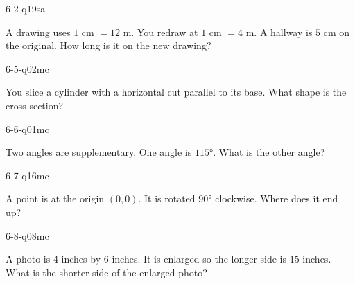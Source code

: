 \begin{practiceQuestion}{6-2-q19}{sa}
\begin{questionText}
A drawing uses $1$ cm $= 12$ m. You redraw at $1$ cm $= 4$ m. A hallway is $5$ cm on the original. How long is it on the new drawing?
\end{questionText}
\end{practiceQuestion}

\begin{practiceQuestion}{6-5-q02}{mc}
\begin{questionText}
You slice a cylinder with a horizontal cut parallel to its base. What shape is the cross-section?
\end{questionText}
\end{practiceQuestion}

\begin{practiceQuestion}{6-6-q01}{mc}
\begin{questionText}
Two angles are supplementary. One angle is $115°$. What is the other angle?
\end{questionText}
\end{practiceQuestion}

\begin{practiceQuestion}{6-7-q16}{mc}
\begin{questionText}
A point is at the origin $(0, 0)$. It is rotated $90°$ clockwise. Where does it end up?
\end{questionText}
\end{practiceQuestion}

\begin{practiceQuestion}{6-8-q08}{mc}
\begin{questionText}
A photo is $4$ inches by $6$ inches. It is enlarged so the longer side is $15$ inches. What is the shorter side of the enlarged photo?
\end{questionText}
\end{practiceQuestion}


